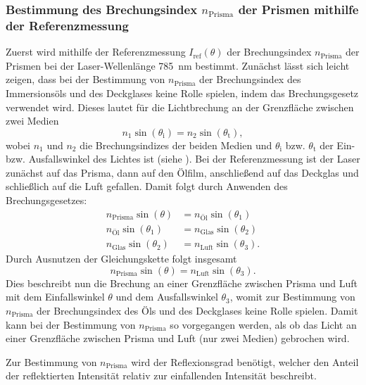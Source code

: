 \subsubsection*{Bestimmung des Brechungsindex $n_{\mathrm{Prisma}}$ der Prismen mithilfe der Referenzmessung}\label{subsubsec:referenz}
Zuerst wird mithilfe der Referenzmessung $I_{\mathrm{ref}}(\theta)$ der Brechungsindex $n_{\mathrm{Prisma}}$ der Prismen bei der Laser-Wellenlänge \SI{785}{\nm}
bestimmt. Zunächst lässt sich leicht zeigen, dass bei der Bestimmung von $n_{\mathrm{Prisma}}$ der Brechungsindex des Immersionsöls und des Deckglases keine Rolle spielen,
indem das Brechungsgesetz verwendet wird. Dieses lautet für die Lichtbrechung an der Grenzfläche zwischen zwei Medien
\begin{equation*}
    n_1 \sin(\theta_{\mathrm{i}}) = n_2 \sin(\theta_{\mathrm{t}}),
\end{equation*} wobei $n_1$ und $n_2$ die Brechungsindizes der beiden Medien und $\theta_{\mathrm{i}}$ bzw. $\theta_{\mathrm{t}}$ der Ein- bzw. Ausfallswinkel des Lichtes
ist (siehe \cite{linden_optik}). Bei der Referenzmessung ist der Laser zunächst auf das Prisma, dann auf den Ölfilm, anschließend auf das Deckglas und schließlich auf die Luft
gefallen. Damit folgt durch Anwenden des Brechungsgesetzes:
\begin{align*}
    n_{\mathrm{Prisma}} \sin(\theta) &= n_{\mathrm{Öl}} \sin(\theta_1) \\
    n_{\mathrm{Öl}} \sin(\theta_1) &= n_{\mathrm{Glas}} \sin(\theta_2) \\
    n_{\mathrm{Glas}} \sin(\theta_2) &= n_{\mathrm{Luft}} \sin(\theta_3) .
\end{align*} Durch Ausnutzen der Gleichungskette folgt insgesamt
\begin{equation*}
    n_{\mathrm{Prisma}} \sin(\theta) = n_{\mathrm{Luft}} \sin(\theta_3) .
\end{equation*} Dies beschreibt nun die Brechung an einer Grenzfläche zwischen Prisma und Luft mit dem Einfallswinkel $\theta$ und dem Ausfallswinkel $\theta_3$, womit
zur Bestimmung von $n_{\mathrm{Prisma}}$ der Brechungsindex des Öls und des Deckglases keine Rolle spielen. Damit kann bei der Bestimmung von $n_{\mathrm{Prisma}}$
so vorgegangen werden, als ob das Licht an einer Grenzfläche zwischen Prisma und Luft (nur zwei Medien) gebrochen wird.\par
Zur Bestimmung von $n_{\mathrm{Prisma}}$ wird der Reflexionsgrad benötigt, welcher den Anteil der reflektierten Intensität relativ zur einfallenden Intensität beschreibt.
